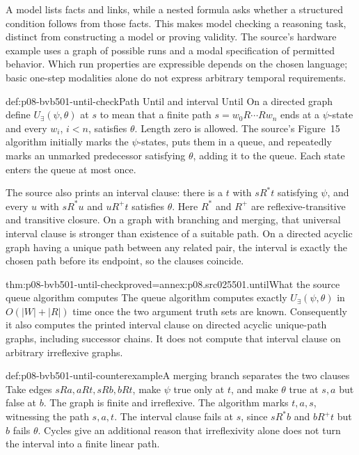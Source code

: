 A model lists facts and links, while a nested formula asks whether a
structured condition follows from those facts. This makes model checking
a reasoning task, distinct from constructing a model or proving validity.
The source's hardware example uses a graph of possible runs and a modal
specification of permitted behavior. Which run properties are expressible
depends on the chosen language; basic one-step modalities alone do not
express arbitrary temporal requirements.

\begin{hbdefinition}{def:p08-bvb501-until-check}{Path Until and interval Until}
On a directed graph define \(U_{\exists}(\psi,\theta)\) at \(s\)
to mean that a finite path \(s=w_0R\cdots Rw_n\) ends at a
\(\psi\)-state and every \(w_i\), \(i<n\), satisfies
\(\theta\). Length zero is allowed. The source's Figure~15 algorithm
initially marks the \(\psi\)-states, puts them in a queue, and repeatedly
marks an unmarked predecessor satisfying \(\theta\), adding it to the
queue. Each state enters the queue at most once.

The source also prints an interval clause: there is a \(t\) with
\(sR^*t\) satisfying \(\psi\), and every \(u\) with
\(sR^*u\) and \(uR^+t\) satisfies \(\theta\).
Here \(R^*\) and \(R^+\) are reflexive-transitive and transitive
closure. On a graph with branching and merging, that universal interval
clause is stronger than existence of a suitable path. On a directed
acyclic graph having a unique path between any related pair, the interval
is exactly the chosen path before its endpoint, so the clauses coincide.
\end{hbdefinition}

\begin{hbtheorem}{thm:p08-bvb501-until-check}{proved=annex:p08.src025501.until}{What the source queue algorithm computes}
The queue algorithm computes exactly \(U_{\exists}(\psi,\theta)\)
in \(O(|W|+|R|)\) time once the two argument truth sets are known.
Consequently it also computes the printed interval clause on directed
acyclic unique-path graphs, including successor chains. It does not
compute that interval clause on arbitrary irreflexive graphs.
\end{hbtheorem}

\begin{hbexample}{def:p08-bvb501-until-counterexample}{A merging branch separates the two clauses}
Take edges \(sRa,aRt,sRb,bRt\), make \(\psi\) true only
at \(t\), and make \(\theta\) true at \(s,a\) but false
at \(b\). The graph is finite and irreflexive. The algorithm marks
\(t,a,s\), witnessing the path \(s,a,t\). The interval clause
fails at \(s\), since \(sR^*b\) and \(bR^+t\) but
\(b\) fails \(\theta\). Cycles give an additional reason that
irreflexivity alone does not turn the interval into a finite linear path.
\end{hbexample}

